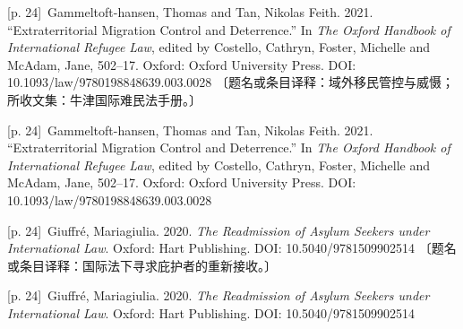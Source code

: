 \documentclass[10pt,a4paper]{article}
\begin{document}
\noindent\begin{minipage}{\textwidth}\begin{minipage}[t]{\dimexpr.5\textwidth-4mm\relax}{\scriptsize\color{gray} [p. 24]}\ Gammeltoft-hansen, Thomas and Tan, Nikolas Feith. 2021. “Extraterritorial Migration Control and Deterrence.” In \textit{The Oxford Handbook of International Refugee Law}, edited by Costello, Cathryn, Foster, Michelle and McAdam, Jane, 502–17. Oxford: Oxford University Press. DOI: 10.1093/law/9780198848639.003.0028 〔题名或条目译释：域外移民管控与威慑；所收文集：牛津国际难民法手册。〕\par\end{minipage}\hfill\begin{minipage}[t]{\dimexpr.5\textwidth-4mm\relax}{\scriptsize\color{gray} [p. 24]}\ Gammeltoft-hansen, Thomas and Tan, Nikolas Feith. 2021. “Extraterritorial Migration Control and Deterrence.” In \textit{The Oxford Handbook of International Refugee Law}, edited by Costello, Cathryn, Foster, Michelle and McAdam, Jane, 502–17. Oxford: Oxford University Press. DOI: 10.1093/law/9780198848639.003.0028\par\end{minipage}\end{minipage}\par
\noindent\begin{minipage}{\textwidth}\begin{minipage}[t]{\dimexpr.5\textwidth-4mm\relax}{\scriptsize\color{gray} [p. 24]}\ Giuffré, Mariagiulia. 2020. \textit{The Readmission of Asylum Seekers under International Law}. Oxford: Hart Publishing. DOI: 10.5040/9781509902514 〔题名或条目译释：国际法下寻求庇护者的重新接收。〕\par\end{minipage}\hfill\begin{minipage}[t]{\dimexpr.5\textwidth-4mm\relax}{\scriptsize\color{gray} [p. 24]}\ Giuffré, Mariagiulia. 2020. \textit{The Readmission of Asylum Seekers under International Law}. Oxford: Hart Publishing. DOI: 10.5040/9781509902514\par\end{minipage}\end{minipage}\par
\end{document}
